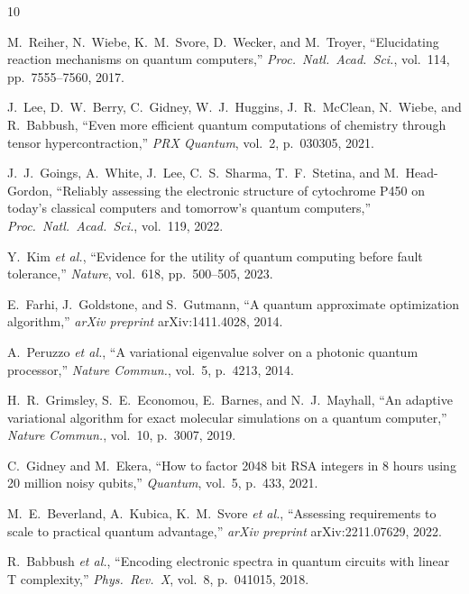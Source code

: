 \documentclass[conference]{IEEEtran}
\begin{document}
\begin{thebibliography}{10}

M.~Reiher, N.~Wiebe, K.~M.~Svore, D.~Wecker, and M.~Troyer,
``Elucidating reaction mechanisms on quantum computers,''
\textit{Proc.\ Natl.\ Acad.\ Sci.}, vol.~114, pp.~7555--7560, 2017.

J.~Lee, D.~W.~Berry, C.~Gidney, W.~J.~Huggins, J.~R.~McClean, N.~Wiebe, and R.~Babbush,
``Even more efficient quantum computations of chemistry through tensor hypercontraction,''
\textit{PRX Quantum}, vol.~2, p.~030305, 2021.

J.~J.~Goings, A.~White, J.~Lee, C.~S.~Sharma, T.~F.~Stetina, and M.~Head-Gordon,
``Reliably assessing the electronic structure of cytochrome P450 on today's classical computers and tomorrow's quantum computers,''
\textit{Proc.\ Natl.\ Acad.\ Sci.}, vol.~119, 2022.

Y.~Kim \textit{et al.},
``Evidence for the utility of quantum computing before fault tolerance,''
\textit{Nature}, vol.~618, pp.~500--505, 2023.

E.~Farhi, J.~Goldstone, and S.~Gutmann,
``A quantum approximate optimization algorithm,''
\textit{arXiv preprint} arXiv:1411.4028, 2014.

A.~Peruzzo \textit{et al.},
``A variational eigenvalue solver on a photonic quantum processor,''
\textit{Nature Commun.}, vol.~5, p.~4213, 2014.

H.~R.~Grimsley, S.~E.~Economou, E.~Barnes, and N.~J.~Mayhall,
``An adaptive variational algorithm for exact molecular simulations on a quantum computer,''
\textit{Nature Commun.}, vol.~10, p.~3007, 2019.

C.~Gidney and M.~Ekera,
``How to factor 2048 bit RSA integers in 8 hours using 20 million noisy qubits,''
\textit{Quantum}, vol.~5, p.~433, 2021.

M.~E.~Beverland, A.~Kubica, K.~M.~Svore \textit{et al.},
``Assessing requirements to scale to practical quantum advantage,''
\textit{arXiv preprint} arXiv:2211.07629, 2022.

R.~Babbush \textit{et al.},
``Encoding electronic spectra in quantum circuits with linear T complexity,''
\textit{Phys.\ Rev.\ X}, vol.~8, p.~041015, 2018.

\end{thebibliography}
\end{document}

